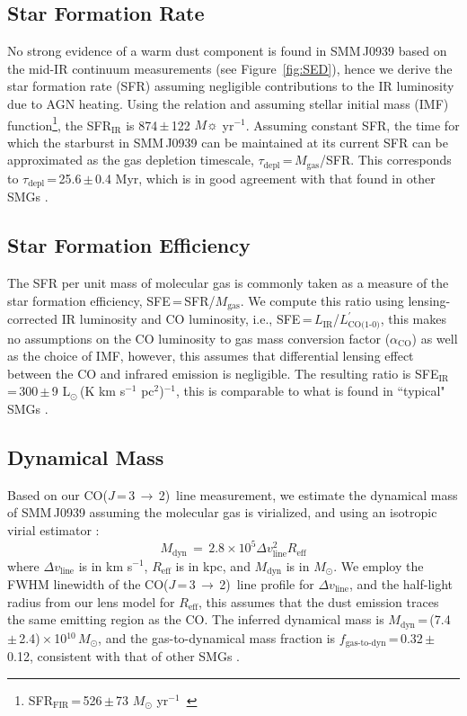 \documentclass[twocolumn,apj,numberedappendix]{emulateapj}
\newcommand{\Msun}{\mbox{$M_{\odot}$}}
\newcommand{\Lsun}{\mbox{L$_{\odot}$}}
\newcommand{\CO}{\mbox{CO($J$\,=\,3\,$\rightarrow$\,2) }}
\newcommand{\Lp}{\mbox{$L^{\prime}_\textrm{CO(1-0)}$}}
\newcommand{\LpU}{\mbox{K\,\,km\,\,s$^{-1}$\,\,pc$^2$}}
\newcommand{\eg}{{\sl e.g.,~}}
\newcommand{\pmOne}{\mbox{$^{-1}$}}
\begin{document}
\subsection{Star Formation Rate}
No strong evidence of a warm dust component is found in SMM\,J0939 based on the mid-IR continuum measurements (see Figure~\ref{fig:SED}), hence we derive the star formation rate (SFR) assuming negligible contributions to the IR luminosity due to AGN heating. 
Using the \citet{Kennicutt98a} relation and assuming \citet{Chabrier03a}
stellar initial mass (IMF) function\footnote{SFR$_\textrm{FIR}$\,=\,526\,$\pm$\,73 $M_
\odot$ yr\pmOne\ }, 
the SFR$_\textrm{IR}$ is 874\,$\pm$\,122\,\,$M\sun$\,\,yr\pmOne.
Assuming constant SFR, the time for which the starburst in SMM\,J0939 can be maintained at its
current SFR can be approximated as the gas depletion timescale, $\tau_\textrm{depl}$\,=\,$M_\textrm{gas}$/SFR. 
This corresponds to $\tau_\textrm{depl}$\,=\,25.6\,$\pm$\,0.4 Myr, which is in good agreement with that found in other SMGs \citep[\eg][]{Greve05a}. 

\subsection{Star Formation Efficiency}
The SFR per unit mass of molecular gas is commonly taken as a
measure of the star formation efficiency, SFE\,=\,SFR/$M_\textrm{gas}$. We compute this ratio using lensing-corrected IR 
luminosity and CO luminosity, i.e., SFE\,=\,$L_\textrm{IR}$/\Lp, this makes no assumptions on the CO luminosity to gas mass conversion factor ($\alpha_\textrm{CO}$) as well as the 
choice of IMF, however, this assumes that differential lensing effect between the CO and infrared emission is negligible. 
The resulting ratio is SFE$_\textrm{IR}$\,=\,300\,$\pm$\,9\,\,\Lsun\,(\LpU)$^{-1}$, this is comparable
to what is found in ``typical" SMGs \citep{Riechers11c,Greve05a,Tacconi06a}.

\subsection{Dynamical Mass} 
Based on our \CO line measurement, we estimate the dynamical mass of SMM\,J0939 assuming the molecular gas is virialized, and using an isotropic virial estimator \citep[\eg][]{Engel10a}:
\begin{equation}
M_\textrm{dyn}\,=\,2.8\times 10^5\Delta v_\textrm{line}^ 2 R_\textrm{eff}
\end{equation}
where $\Delta v_\textrm{line}$ is in km\,\,s\pmOne, $R_\textrm{eff}$ is in kpc, and $M_\textrm{dyn}$ is in \Msun.
We employ the FWHM linewidth of the \CO line profile for $\Delta v_\textrm{line}$,
and the half-light radius from our lens model for $R_\textrm{eff}$, this assumes that the dust emission traces the same emitting region as the CO. The inferred dynamical mass is $M_\textrm{dyn}$\,=\,(7.4\,$\pm$\,2.4)\,$\times$\,10$^{10}$\,\Msun, and the gas-to-dynamical mass fraction is $f_\textrm{gas-to-dyn}$\,=\,0.32\,$\pm$\,0.12, consistent with that of other SMGs \citep{Tacconi06a}.
\end{document}
